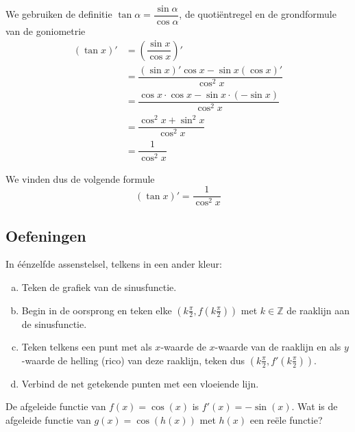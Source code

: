 \documentclass[12pt]{article}
\begin{document}
\begin{theorie}
We gebruiken de definitie $\tan\alpha = \dfrac{\sin\alpha}{\cos\alpha}$, de quotiëntregel en de grondformule van de goniometrie
\begin{align*}
  \left(\tan x\right)' &= \left(\dfrac{\sin x}{\cos x}\right)'\\
                       &= \dfrac{\left(\sin x\right)'\cos x - \sin x \left(\cos x\right)'}{\cos^2 x}\\
                       &= \dfrac{\cos x\cdot\cos x - \sin x \cdot(- \sin x)}{\cos^2 x}\\
                       &= \dfrac{\cos^2 x + \sin^2 x}{\cos^2 x}\\
                       &= \dfrac{1}{\cos^2 x}
\end{align*}

We vinden dus de volgende formule
$$\left(\tan x\right)'=\dfrac{1}{\cos^2 x}$$
\vspace*{1cm}

\subsection{Oefeningen}

\end{theorie}

\begin{oefening}
In éénzelfde assenstelsel, telkens in een ander kleur:
\begin{enumerate}[(a)]
  \item Teken de grafiek van de sinusfunctie. 
  \item Begin in de oorsprong en teken elke $(k\frac{\pi}{2}, f(k\frac{\pi}{2}))$ met $k\in\mathbb{Z}$ de raaklijn aan de sinusfunctie.
  \item Teken telkens een punt met als $x$-waarde de $x$-waarde van de raaklijn en als $y$-waarde de helling (rico) van deze raaklijn, teken dus $(k\frac{\pi}{2}, f'(k\frac{\pi}{2}))$.
  \item Verbind de net getekende punten met een vloeiende lijn.
\end{enumerate}
\end{oefening}

\begin{oefening}
De afgeleide functie van $f(x)=\cos(x)$ is $f'(x)=-\sin(x)$. Wat is de afgeleide functie van $g(x)=\cos(h(x))$ met $h(x)$ een reële functie?
\end{oefening}
\end{document}
